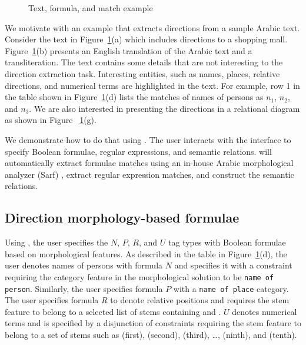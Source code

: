 \begin{appendices}
\begin{figure}[tb!]
{\begin{tabular}{R{10cm} C{10cm}}
\end{tabular}
}
  \caption{Text, formula, and match \framework example}
  \label{fig:motiv}
\end{figure}
\transtrue
{}

We motivate \framework with an example that extracts directions from a sample Arabic text. 
Consider the text in Figure~\ref{fig:motiv}(a) which includes directions to a shopping mall. 
Figure~\ref{fig:motiv}(b) presents an English translation of the Arabic text and a transliteration. 
The text contains some details that are not interesting to the direction extraction task. 
Interesting entities, such as names, places, relative directions, 
and numerical terms are highlighted in the text. 
For example, row 1 in the table shown in Figure~\ref{fig:motiv}(d) 
lists the matches of names of persons as $n_1$, $n_2$, and $n_3$. 
We are also interested in presenting the directions in a relational diagram as shown in Figure ~\ref{fig:motiv}(g).

We demonstrate how to do that using \framework. 
The user interacts with the \framework interface to specify Boolean 
formulae, regular expressions, and semantic relations. 
\framework will automatically extract formulae matches 
using an in-house Arabic morphological analyzer (Sarf)
\cite{ZaMaColing2012DemosSarf},
extract regular expression matches, and construct the 
semantic relations.

\subsection*{Direction morphology-based formulae}

Using \framework, the user specifies the $N$, $P$, $R$, and $U$ tag 
types with Boolean formulae based on morphological features. 
As described in the table in Figure~\ref{fig:motiv}(d), the user denotes 
names of persons with formula $N$ and specifies it with a constraint 
requiring the category feature in the morphological solution to be {\tt name of person}. 
Similarly, the user specifies formula $P$ with a {\tt name of place} category. 
The user specifies formula 
$R$ to denote relative positions and requires the stem feature to belong to a selected list of 
stems containing  and . 
$U$ denotes numerical terms and is specified by a disjunction of constraints 
requiring the stem feature to belong to a set of stems such as
(first), (second), (third), 
\dots, (ninth), and (tenth).


\end{appendices}
